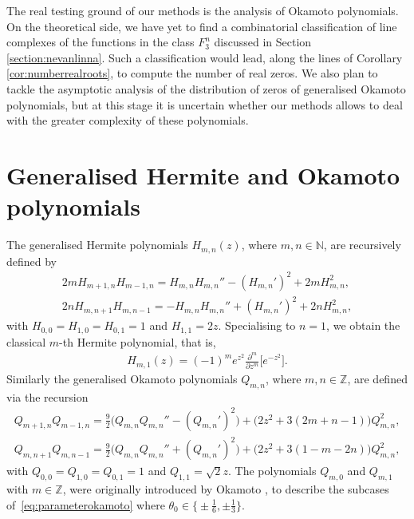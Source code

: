 \documentclass[pdftex]{sigma}
\numberwithin{equation}{section}
\begin{document}
The real testing ground of our methods is the analysis of Okamoto polynomials.
On the theoretical side, we have yet to f\/ind a combinatorial classif\/ication
of line complexes of the functions in the class $F_3^n$ discussed in Section \ref{section:nevanlinna}. Such a classif\/ication
would lead, along the lines of Corollary \ref{cor:numberrealroots}, to compute the number of real zeros.
We also plan to tackle the asymptotic analysis of the distribution of zeros of generalised Okamoto polynomials, but at this stage it is uncertain
whether our methods allows to deal with the greater complexity of these polynomials.

\appendix
\section{Generalised Hermite and Okamoto polynomials}
\label{appendix:generalisedhermite}
The generalised Hermite polynomials $H_{m,n}(z)$, where $m,n\in\mathbb{N}$, are recursively def\/ined by
	\begin{gather*}
	2mH_{m+1,n}H_{m-1,n}=H_{m,n}H_{m,n}''- (H_{m,n}' )^2+2mH_{m,n}^2,\\
	2nH_{m,n+1}H_{m,n-1}=-H_{m,n}H_{m,n}''+ (H_{m,n}' )^2+2nH_{m,n}^2,
	\end{gather*}
with $H_{0,0}=H_{1,0}=H_{0,1}=1$ and $H_{1,1}=2z$. Specialising to $n=1$, we obtain the classical $m$-th Hermite polynomial, that is,
\begin{gather*}
H_{m,1}(z)=(-1)^me^{z^2}\frac{\partial^m}{\partial z^m}\big[e^{-z^2}\big].
\end{gather*}
Similarly the generalised Okamoto polynomials $Q_{m,n}$, where $m,n\in\mathbb{Z}$, are def\/ined via the recursion
\begin{gather*}
Q_{m+1,n}Q_{m-1,n}=\tfrac{9}{2}\big(Q_{m,n}Q_{m,n}''- (Q_{m,n}' )^2\big)+\big(2z^2+3(2m+n-1)\big)Q_{m,n}^2,\\
Q_{m,n+1}Q_{m,n-1}=\tfrac{9}{2}\big(Q_{m,n}Q_{m,n}''+ (Q_{m,n}' )^2\big)+\big(2z^2+3(1-m-2n)\big)Q_{m,n}^2,
\end{gather*}
with $Q_{0,0}=Q_{1,0}=Q_{0,1}=1$ and $Q_{1,1}=\sqrt{2}z$. The polynomials $Q_{m,0}$ and $Q_{m,1}$ with $m\in\mathbb{Z}$, were originally introduced by Okamoto \cite{okamoto}, to describe the subcases of~\eqref{eq:parameterokamoto} where $\theta_0\in\big\{\pm \frac{1}{6},\pm \frac{1}{3}\big\}$.
\end{document}
